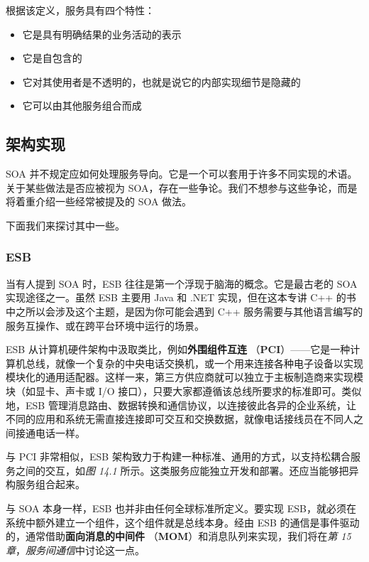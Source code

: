 \label{idx:1307}
根据该定义，服务具有四个特性：

\begin{itemize}
\item 它是具有明确结果的业务活动的表示
\item 它是自包含的
\item 它对其使用者是不透明的，也就是说它的内部实现细节是隐藏的
\label{idx:1308}
\item 它可以由其他服务组合而成
\end{itemize}

\subsection{架构实现}

\label{idx:1309}
SOA 并不规定应如何处理服务导向。它是一个可以套用于许多不同实现的术语。关于某些做法是否应被视为 SOA，存在一些争论。我们不想参与这些争论，而是将着重介绍一些经常被提及的 SOA 做法。

下面我们来探讨其中一些。

\subsubsection{ESB}

\label{idx:1310}
\label{idx:1311}
当有人提到 SOA 时，ESB 往往是第一个浮现于脑海的概念。它是最古老的 SOA 实现途径之一。虽然 ESB 主要用 Java 和 .NET 实现，但在这本专讲 C++ 的书中之所以会涉及这个主题，是因为你可能会遇到 C++ 服务需要与其他语言编写的服务互操作、或在跨平台环境中运行的场景。

\label{idx:1312}
ESB 从计算机硬件架构中汲取类比，例如\textbf{外围组件互连 }（\textbf{PCI}）——它是一种计算机总线，就像一个复杂的中央电话交换机，或一个用来连接各种电子设备以实现模块化的通用适配器。这样一来，第三方供应商就可以独立于主板制造商来实现模块（如显卡、声卡或 I/O 接口），只要大家都遵循该总线所要求的标准即可。类似地，ESB 管理消息路由、数据转换和通信协议，以连接彼此各异的企业系统，让不同的应用和系统无需直接连接即可交互和交换数据，就像电话接线员在不同人之间接通电话一样。

\label{idx:1313}
\label{idx:1314}
与 PCI 非常相似，ESB 架构致力于构建一种标准、通用的方式，以支持松耦合服务之间的交互，如\emph{图 14.1} 所示。这类服务应能独立开发和部署。还应当能够把异构服务组合起来。


\label{idx:1315}
与 SOA 本身一样，ESB 也并非由任何全球标准所定义。要实现 ESB，就必须在系统中额外建立一个组件，这个组件就是总线本身。经由 ESB 的通信是事件驱动的，通常借助\textbf{面向消息的中间件 }（\textbf{MOM}）和消息队列来实现，我们将在\emph{第 15 章}，\emph{服务间通信}中讨论这一点。

